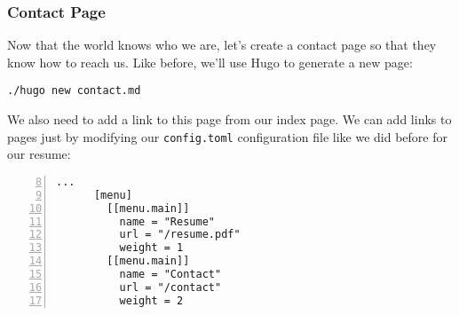 \begin{frame}[fragile]
    \frametitle{Contact Page}

    Now that the world knows who we are, let's create a contact page so that they know how to reach us.
    Like before, we'll use Hugo to generate a new page:

    \medskip

    \begin{lstlisting}[style=saneCode,gobble=6]
      ./hugo new contact.md
    \end{lstlisting}

    \vfill

    We also need to add a link to this page from our index page. We can add links to pages just by modifying our 
    \texttt{config.toml} configuration file like we did before for our resume:

    \begin{lstlisting}[style=saneCode,gobble=6,title={config.toml},numbers=left,firstnumber=8]
      ...
      [menu]
        [[menu.main]]
          name = "Resume"
          url = "/resume.pdf"
          weight = 1
        [[menu.main]]
          name = "Contact"
          url = "/contact"
          weight = 2
    \end{lstlisting}
\end{frame}